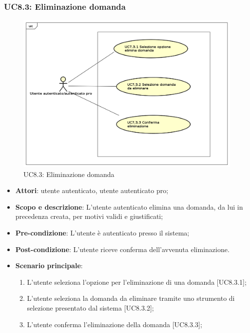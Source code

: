 	\subsubsection{UC8.3: Eliminazione domanda}	
	\label{UC8.3}
	\begin{figure}[h]
		\centering
			\includegraphics[scale=0.45,keepaspectratio]{UML/UC8_3.png}
		\caption{UC8.3: Eliminazione domanda}
	\end{figure}
	\FloatBarrier
	\begin{itemize}
		\item
			\textbf{Attori}: utente autenticato, utente autenticato pro;
		\item		
			\textbf{Scopo e descrizione}: L'utente autenticato elimina una domanda, da lui in precedenza creata, per motivi validi e giustificati;
		\item
			\textbf{Pre-condizione}: L'utente è autenticato presso il sistema;
		\item
			\textbf{	Post-condizione}: L'utente riceve conferma dell'avvenuta eliminazione.
		\item
			\textbf{Scenario principale}:
	       		\begin{enumerate}
					\item 	
					L'utente seleziona l'opzione per l'eliminazione di una domanda [UC8.3.1];
					\item
					L'utente seleziona la domanda da eliminare tramite uno strumento di selezione presentato dal sistema [UC8.3.2];
					\item
					L'utente conferma l'eliminazione della domanda [UC8.3.3];
	 			\end{enumerate}
	\end{itemize}
